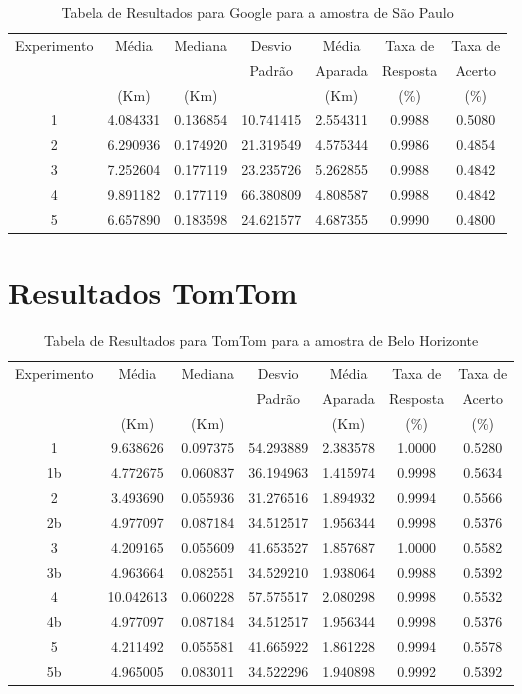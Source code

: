 \begin{anexosenv}
\begin{table}[ht]
\centering
\begin{tabular}{|c|c|c|c|c|c|c|}
\hline
Experimento & Média & Mediana & Desvio & Média & Taxa de & Taxa de \\
    & & & Padrão & Aparada & Resposta & Acerto \\
    & (Km) & (Km) & & (Km) & (\%) & (\%) \\ \hline
1 & 4.084331 & 0.136854 & 10.741415 & 2.554311 & 0.9988 & 0.5080 \\ \hline
2 & 6.290936 & 0.174920 & 21.319549 & 4.575344 & 0.9986 & 0.4854 \\ \hline
3 & 7.252604 & 0.177119 & 23.235726 & 5.262855 & 0.9988 & 0.4842 \\ \hline
4 & 9.891182 & 0.177119 & 66.380809 & 4.808587 & 0.9988 & 0.4842 \\ \hline
5 & 6.657890 & 0.183598 & 24.621577 & 4.687355 & 0.9990 & 0.4800 \\ \hline
\end{tabular}
\caption{Tabela de Resultados para Google para a amostra de São Paulo}
\label{tab:googleSP}
\end{table}
    

\section{Resultados TomTom}

\begin{table}[ht]
\centering
\begin{tabular}{|c|c|c|c|c|c|c|}
\hline
Experimento & Média & Mediana & Desvio & Média & Taxa de & Taxa de \\
 & & & Padrão & Aparada & Resposta & Acerto \\
 & (Km) & (Km) & & (Km) & (\%) & (\%) \\ \hline
1 & 9.638626 & 0.097375 & 54.293889 & 2.383578 & 1.0000 & 0.5280 \\ \hline
1b & 4.772675 & 0.060837 & 36.194963 & 1.415974 & 0.9998 & 0.5634 \\ \hline
2 & 3.493690 & 0.055936 & 31.276516 & 1.894932 & 0.9994 & 0.5566 \\ \hline
2b & 4.977097 & 0.087184 & 34.512517 & 1.956344 & 0.9998 & 0.5376 \\ \hline
3 & 4.209165 & 0.055609 & 41.653527 & 1.857687 & 1.0000 & 0.5582 \\ \hline
3b & 4.963664 & 0.082551 & 34.529210 & 1.938064 & 0.9988 & 0.5392 \\ \hline
4 & 10.042613 & 0.060228 & 57.575517 & 2.080298 & 0.9998 & 0.5532 \\ \hline
4b & 4.977097 & 0.087184 & 34.512517 & 1.956344 & 0.9998 & 0.5376 \\ \hline
5 & 4.211492 & 0.055581 & 41.665922 & 1.861228 & 0.9994 & 0.5578 \\ \hline
5b & 4.965005 & 0.083011 & 34.522296 & 1.940898 & 0.9992 & 0.5392 \\ \hline
\end{tabular}
\caption{Tabela de Resultados para TomTom para a amostra de Belo Horizonte}
\label{tab:tomtomBH}
\end{table}


\end{anexosenv}
